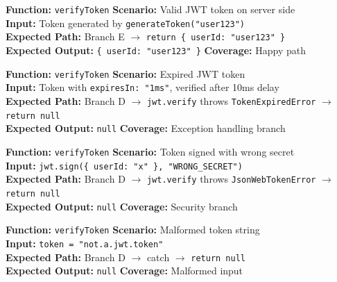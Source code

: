 ﻿\documentclass[12pt,a4paper]{report}
\newcommand{\pone}{\textbf{\color{p1red}P1}}
\begin{document}
\begin{tcolorbox}[testbox,title={AUTH-004 \hfill \pone}]
\textbf{Function:} \texttt{verifyToken} \quad \textbf{Scenario:} Valid JWT token on server side \\
\textbf{Input:} Token generated by \texttt{generateToken("user123")} \\
\textbf{Expected Path:} Branch E $\to$ \texttt{return \{ userId: "user123" \}} \\
\textbf{Expected Output:} \texttt{\{ userId: "user123" \}} \quad \textbf{Coverage:} Happy path
\end{tcolorbox}

\begin{tcolorbox}[criticalbox,title={AUTH-005 \hfill \pone\ --- Expired Token}]
\textbf{Function:} \texttt{verifyToken} \quad \textbf{Scenario:} Expired JWT token \\
\textbf{Input:} Token with \texttt{expiresIn: "1ms"}, verified after 10ms delay \\
\textbf{Expected Path:} Branch D $\to$ \texttt{jwt.verify} throws \texttt{TokenExpiredError} $\to$ \texttt{return null} \\
\textbf{Expected Output:} \texttt{null} \quad \textbf{Coverage:} Exception handling branch
\end{tcolorbox}

\begin{tcolorbox}[criticalbox,title={AUTH-006 \hfill \pone\ --- Wrong Secret}]
\textbf{Function:} \texttt{verifyToken} \quad \textbf{Scenario:} Token signed with wrong secret \\
\textbf{Input:} \texttt{jwt.sign(\{ userId: "x" \}, "WRONG\_SECRET")} \\
\textbf{Expected Path:} Branch D $\to$ \texttt{jwt.verify} throws \texttt{JsonWebTokenError} $\to$ \texttt{return null} \\
\textbf{Expected Output:} \texttt{null} \quad \textbf{Coverage:} Security branch
\end{tcolorbox}

\begin{tcolorbox}[testbox,title={AUTH-007 \hfill \pone}]
\textbf{Function:} \texttt{verifyToken} \quad \textbf{Scenario:} Malformed token string \\
\textbf{Input:} \texttt{token = "not.a.jwt.token"} \\
\textbf{Expected Path:} Branch D $\to$ catch $\to$ \texttt{return null} \\
\textbf{Expected Output:} \texttt{null} \quad \textbf{Coverage:} Malformed input
\end{tcolorbox}
\end{document}
